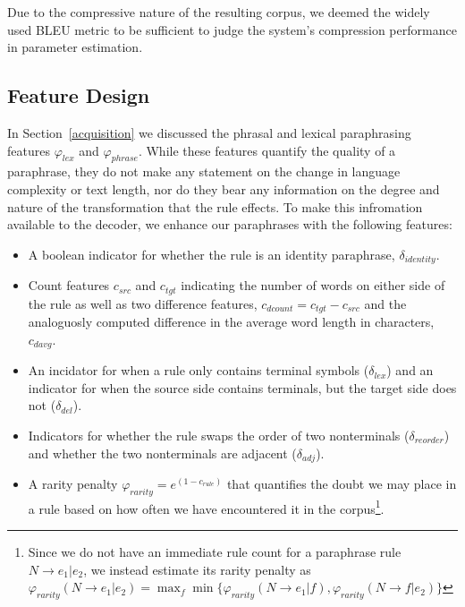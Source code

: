 \documentclass[11pt]{article}
\begin{document}
Due to the compressive nature of the resulting corpus, we deemed the
widely used BLEU metric \cite{Papineni2002} to be sufficient to judge
the system's compression performance in parameter estimation.

\subsection{Feature Design}
In Section~\ref{acquisition} we discussed the phrasal and lexical
paraphrasing features $\varphi_{\mathit{lex}}$ and
$\varphi_{\mathit{phrase}}$. While these features quantify the quality
of a paraphrase, they do not make any statement on the change in
language complexity or text length, nor do they bear any information
on the degree and nature of the transformation that the rule
effects. To make this infromation available to the decoder, we enhance
our paraphrases with the following features:
\begin{itemize}
\item A boolean indicator for whether the rule is an identity
  paraphrase, $\delta_{\mathit{identity}}$.

\item Count features $c_{\mathit{src}}$ and $c_{\mathit{tgt}}$
  indicating the number of words on either side of the rule as well as
  two difference features, $c_{\mathit{dcount}} = c_{\mathit{tgt}} -
  c_{\mathit{src}}$ and the analoguosly computed difference in the
  average word length in characters, $c_{\mathit{davg}}$.

\item An incidator for when a rule only contains terminal symbols
  ($\delta_{\mathit{lex}}$) and an indicator for when the source side
  contains terminals, but the target side does not
  ($\delta_{\mathit{del}}$).

\item Indicators for whether the rule swaps the order of two
  nonterminals ($\delta_{\mathit{reorder}}$) and whether the two
  nonterminals are adjacent ($\delta_{\mathit{adj}}$).

\item A rarity penalty $\varphi_{\mathit{rarity}} =
  e^{(1-c_{\mathit{rule}})}$ that quantifies the doubt we may place in
  a rule based on how often we have encountered it in the
  corpus\footnote{Since we do not have an immediate rule count for a
    paraphrase rule $N \rightarrow e_1 | e_2$, we instead estimate
    its rarity penalty as $\varphi_{\mathit{rarity}}(N
    \rightarrow e_1 | e_2) = \max_{f} \min
    \{\varphi_{\mathit{rarity}}(N \rightarrow e_1 | f),
    \varphi_{\mathit{rarity}}(N \rightarrow f | e_2) \}$}.
\end{itemize}
\end{document}
